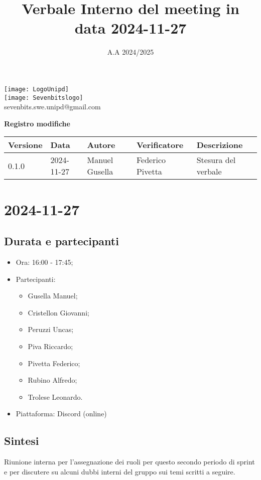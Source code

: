 \documentclass[10pt]{article}
\title{Verbale Interno del meeting in data 2024-11-27}
\date{A.A 2024/2025}
\begin{document}
\maketitle
\begin{center}
\texttt{[image: LogoUnipd]}\\
\texttt{[image: Sevenbitslogo]}\\
sevenbits.swe.unipd@gmail.com\\
\vspace{2mm}

\textbf{Registro modifiche}\\
\vspace{2mm}
\begin{tabularx}{\textwidth}{|l|l|l|l|X|}
\hline
\textbf{Versione} & \textbf{Data} & \textbf{Autore} & \textbf{Verificatore} & \textbf{Descrizione} \\
\hline
0.1.0 & 2024-11-27 & Manuel Gusella & Federico Pivetta & Stesura del verbale\\
\hline
\end{tabularx}
\end{center}

\newpage
\tableofcontents
\newpage
\section{2024-11-27}
\subsection{Durata e partecipanti}
\begin{itemize}
\item Ora: 16:00 - 17:45;
\item Partecipanti: 	
	\begin{itemize}
	\item Gusella Manuel;
	\item Cristellon Giovanni;
	\item Peruzzi Uncas;
	\item Piva Riccardo;
	\item Pivetta Federico;
	\item Rubino Alfredo;
	\item Trolese Leonardo.
	\end{itemize}
\item Piattaforma: Discord (online)
\end{itemize}
\subsection{Sintesi}
Riunione interna per l'assegnazione dei ruoli per questo secondo periodo di sprint e per discutere su alcuni dubbi interni del gruppo sui temi scritti a seguire.
\end{document}
